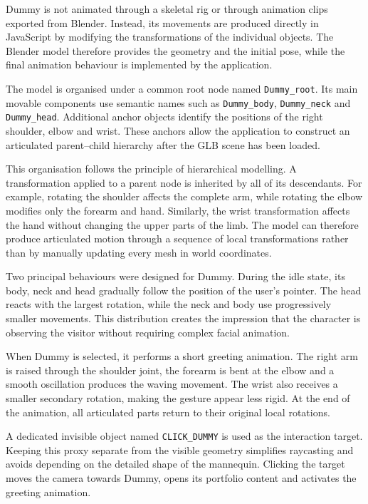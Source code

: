 \documentclass{report}
\begin{document}
Dummy is not animated through a skeletal rig or through animation clips
exported from Blender. Instead, its movements are produced directly in
JavaScript by modifying the transformations of the individual objects.
The Blender model therefore provides the geometry and the initial pose,
while the final animation behaviour is implemented by the application.

The model is organised under a common root node named
\texttt{Dummy\_root}. Its main movable components use semantic names
such as \texttt{Dummy\_body}, \texttt{Dummy\_neck} and
\texttt{Dummy\_head}. Additional anchor objects identify the positions
of the right shoulder, elbow and wrist. These anchors allow the
application to construct an articulated parent--child hierarchy after
the GLB scene has been loaded.

This organisation follows the principle of hierarchical modelling. A
transformation applied to a parent node is inherited by all of its
descendants. For example, rotating the shoulder affects the complete
arm, while rotating the elbow modifies only the forearm and hand.
Similarly, the wrist transformation affects the hand without changing
the upper parts of the limb. The model can therefore produce articulated
motion through a sequence of local transformations rather than by
manually updating every mesh in world coordinates.

Two principal behaviours were designed for Dummy. During the idle state,
its body, neck and head gradually follow the position of the user's
pointer. The head reacts with the largest rotation, while the neck and
body use progressively smaller movements. This distribution creates the
impression that the character is observing the visitor without requiring
complex facial animation.

When Dummy is selected, it performs a short greeting animation. The
right arm is raised through the shoulder joint, the forearm is bent at
the elbow and a smooth oscillation produces the waving movement. The
wrist also receives a smaller secondary rotation, making the gesture
appear less rigid. At the end of the animation, all articulated parts
return to their original local rotations.

A dedicated invisible object named \texttt{CLICK\_DUMMY} is used as the
interaction target. Keeping this proxy separate from the visible
geometry simplifies raycasting and avoids depending on the detailed
shape of the mannequin. Clicking the target moves the camera towards
Dummy, opens its portfolio content and activates the greeting animation.
\end{document}
